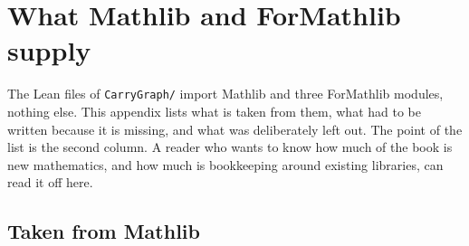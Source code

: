 \chapter{What Mathlib and ForMathlib supply}\label{app:mathlib}

The Lean files of \texttt{CarryGraph/} import Mathlib and three ForMathlib modules, nothing
else. This appendix lists what is taken from them, what had to be written because it is missing,
and what was deliberately left out. The point of the list is the second column. A reader who
wants to know how much of the book is new mathematics, and how much is bookkeeping around
existing libraries, can read it off here.

\section*{Taken from Mathlib}

